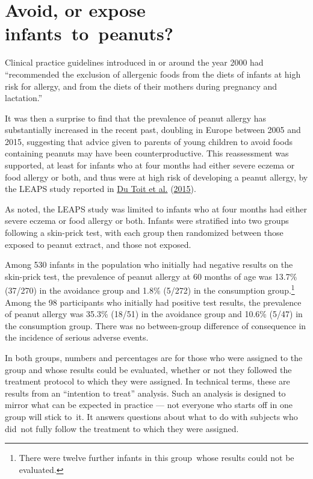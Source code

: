 \documentclass[
  10pt,
  b5paper]{book}
\begin{document}
\hypertarget{avoid-or-expose-infants-to-peanuts}{%
\section{Avoid, or expose infants~to~peanuts?}\label{avoid-or-expose-infants-to-peanuts}}

Clinical practice guidelines introduced in or around the
year 2000 had ``recommended the exclusion of
allergenic foods from the diets of infants at high risk for
allergy, and from the diets of their mothers during pregnancy
and lactation.''

It was then a surprise to find that
the prevalence of peanut allergy has substantially increased
in the recent past, doubling in Europe between 2005 and 2015,
suggesting that advice given to parents of young children to
avoid foods containing peanuts may have been counterproductive.
This reassessment was supported, at least for infants who
at four months had either severe eczema or food allergy or
both, and thus were at high risk of developing a peanut
allergy, by the LEAPS study reported in \protect\hyperlink{ref-du2015randomized}{Du Toit et al.} (\protect\hyperlink{ref-du2015randomized}{2015}).

As noted, the LEAPS study was limited to infants who at four
months had either severe eczema or food allergy or both.
Infants were stratified into two groups following a skin-prick
test, with each group then randomized between those exposed
to peanut extract, and those not exposed.

Among 530 infants in the population who initially had negative results on the skin-prick test, the prevalence of peanut allergy at 60 months of age was 13.7\% (37/270) in the avoidance group and 1.8\% (5/272) in the consumption group.\footnote{There were twelve further infants in this group~whose results
  could not be evaluated.}
Among the 98 participants who initially had positive test results, the prevalence of peanut allergy was 35.3\% (18/51) in the avoidance group
and 10.6\% (5/47) in the consumption group. There was no
between-group difference of consequence in the incidence of
serious adverse events.

In both groups, numbers and percentages are for those who were assigned
to the group and whose results could be evaluated, whether or not they
followed the treatment protocol to which they were assigned. In technical
terms, these are results from an ``intention to treat'' analysis. Such an
analysis is designed to mirror what can be expected in practice --- not
everyone who starts off in one group will stick to~it. It answers
questions about what to do with subjects who did~not fully follow
the treatment to which they were assigned.
\end{document}
